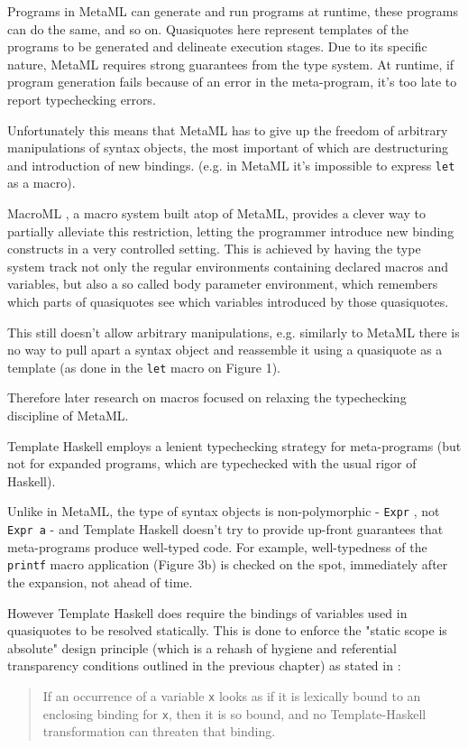 \documentclass[10pt,journal,a4paper]{IEEEtran}
\begin{document}
Programs in MetaML can generate and run programs at runtime, these programs can do the same, and so on.
Quasiquotes here represent templates of the programs to be generated and delineate execution stages.
Due to its specific nature, MetaML requires strong guarantees from the type system.
At runtime, if program generation fails because of an error in the meta-program,
it's too late to report typechecking errors.

Unfortunately this means that MetaML has to give up the freedom of arbitrary manipulations
of syntax objects, the most important of which are destructuring and introduction of new bindings.
(e.g. in MetaML it’s impossible to express \small \texttt{let} \normalsize as a macro).

MacroML \cite{ganz01,taha03}, a macro system built atop of MetaML,
provides a clever way to partially alleviate this restriction, letting
the programmer introduce new binding constructs in a very controlled setting.
This is achieved by having the type system track
not only the regular environments containing declared macros and variables, but also
a so called body parameter environment, which remembers which parts of quasiquotes
see which variables introduced by those quasiquotes.

This still doesn't allow arbitrary manipulations, e.g. similarly to MetaML there is no way
to pull apart a syntax object and reassemble it using a quasiquote as a template
(as done in the \small \texttt{let} \normalsize macro on Figure 1).

Therefore later research on macros focused on relaxing the typechecking discipline of MetaML.

Template Haskell \cite{sheard02} employs a lenient typechecking strategy for meta-programs
(but not for expanded programs, which are typechecked with the usual rigor of Haskell).

Unlike in MetaML, the type of syntax objects is non-polymorphic - \small \texttt{Expr} \normalsize,
not \small \texttt{Expr a} \normalsize - and Template Haskell doesn't try to provide up-front
guarantees that meta-programs produce well-typed code. For example, well-typedness of the
\small \texttt{printf} \normalsize macro application (Figure 3b) is checked on the spot,
immediately after the expansion, not ahead of time.

However Template Haskell does require the bindings of variables used in quasiquotes to be resolved statically.
This is done to enforce the "static scope is absolute" design principle
(which is a rehash of hygiene and referential transparency conditions outlined in the previous chapter)
as stated in \cite{sheard03}:
\begin{quote}
If an occurrence of a variable \small \texttt{x} \normalsize looks as if it is lexically bound
to an enclosing binding for \small \texttt{x}\normalsize,
then it is so bound, and no Template-Haskell transformation can threaten that binding.
\end{quote}
\end{document}
